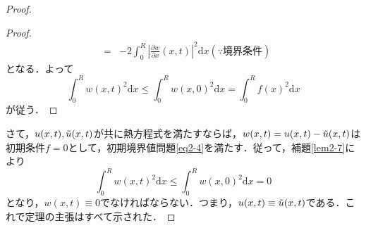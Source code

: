 \documentclass[a4j]{jsbook}
\numberwithin{theorem}{chapter}  %
\begin{document}
\begin{proof}
\begin{proof}
\begin{eqnarray*}
&=&-2\int_0^R\left|\frac{\partial w}{\partial x}(x, t)\right|^2\mathrm{d}x (\because\mbox{境界条件})
\end{eqnarray*}
となる．よって
\begin{equation*}
    \int_0^R w(x, t)^2\mathrm{d}x\leq\int_0^R w(x, 0)^2\mathrm{d}x=\int_0^R f(x)^2\mathrm{d}x
\end{equation*}
が従う．
\end{proof}
さて，\(u(x, t), \Tilde{u}(x, t)\)が共に熱方程式を満たすならば，\(w(x, t)=u(x, t)-\Tilde{u}(x, t)\)は初期条件\(f=0\)として，初期境界値問題\eqref{eq2-4}を満たす．従って，補題\ref{lem2-7}により
\begin{equation*}
    \int_0^R w(x, t)^2\mathrm{d}x\leq\int_0^R w(x, 0)^2\mathrm{d}x=0
\end{equation*}
となり，\(w(x, t)\equiv 0\)でなければならない．つまり，\(u(x, t)\equiv\Tilde{u}(x, t)\)である．これで定理の主張はすべて示された．
\end{proof}
\end{document}
